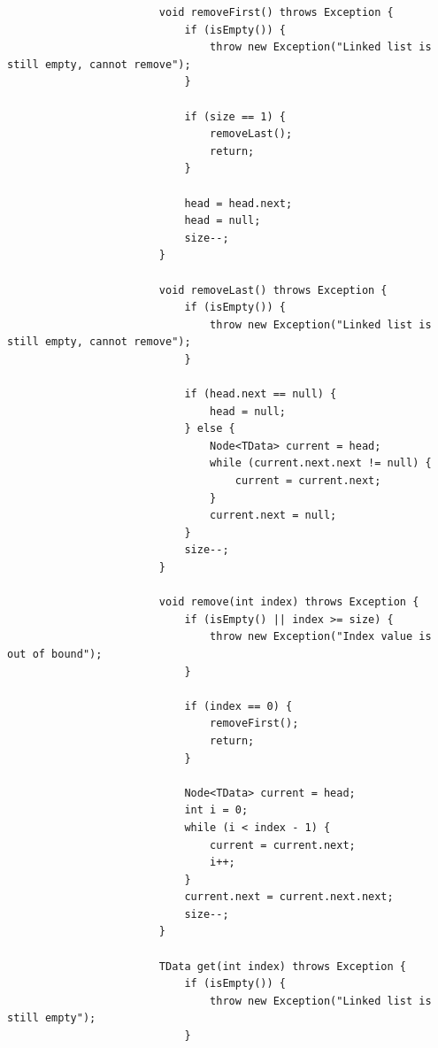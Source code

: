 \documentclass[12pt,titlepage]{article}
\begin{document}
\begin{enumerate}
{\begin{itemize}
{\begin{verbatim}
                        void removeFirst() throws Exception {
                            if (isEmpty()) {
                                throw new Exception("Linked list is still empty, cannot remove");
                            }

                            if (size == 1) {
                                removeLast();
                                return;
                            }

                            head = head.next;
                            head = null;
                            size--;
                        }

                        void removeLast() throws Exception {
                            if (isEmpty()) {
                                throw new Exception("Linked list is still empty, cannot remove");
                            }

                            if (head.next == null) {
                                head = null;
                            } else {
                                Node<TData> current = head;
                                while (current.next.next != null) {
                                    current = current.next;
                                }
                                current.next = null;
                            }
                            size--;
                        }

                        void remove(int index) throws Exception {
                            if (isEmpty() || index >= size) {
                                throw new Exception("Index value is out of bound");
                            }

                            if (index == 0) {
                                removeFirst();
                                return;
                            }

                            Node<TData> current = head;
                            int i = 0;
                            while (i < index - 1) {
                                current = current.next;
                                i++;
                            }
                            current.next = current.next.next;
                            size--;
                        }

                        TData get(int index) throws Exception {
                            if (isEmpty()) {
                                throw new Exception("Linked list is still empty");
                            }


\end{verbatim}}
\end{itemize}}
\end{enumerate}
\end{document}
